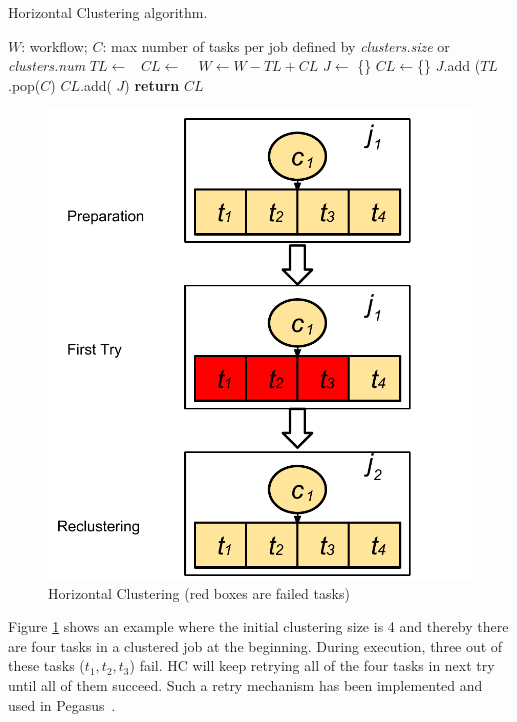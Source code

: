 \documentclass{IOS-Book-Article}
\begin{document}
\begin{algorithm}[!htb]
	\footnotesize
	\caption{Horizontal Clustering algorithm.}
	\label{alg:evaluation_hc}
	\begin{algorithmic}[1]
		\Require $W$: workflow; $C$: max number of tasks per job defined by \emph{clusters.size} or \emph{clusters.num}
				\State $TL\gets $\  
				\State $CL\gets$  \  
				\State $W \gets W - TL + CL$   
			\EndFor
		\EndProcedure
			\State $J\gets$ \{\}
			\State $CL\gets$\{\}
				\State $J$.add ($TL$.pop($C$) 
				\State  $CL$.add( $J$)
			\EndWhile
			\State \textbf{return} $CL$
		\EndProcedure
	\end{algorithmic}
\end{algorithm}

\begin{figure}[!htb]
\centering
  \includegraphics[width=0.55\linewidth]{hcr.pdf}
  \caption{Horizontal Clustering (red boxes are failed tasks)}
  \label{fig:clustering_hc}
\end{figure}

Figure \ref{fig:clustering_hc} shows an example where the initial clustering size is 4 and thereby there are four tasks in a clustered job at the beginning. During execution, three out of these tasks ($t_1, t_2, t_3$) fail. HC will keep retrying all of the four tasks in next try until all of them succeed. Such a retry mechanism has been implemented and used in Pegasus~\cite{Singh2008}.
\end{document}
